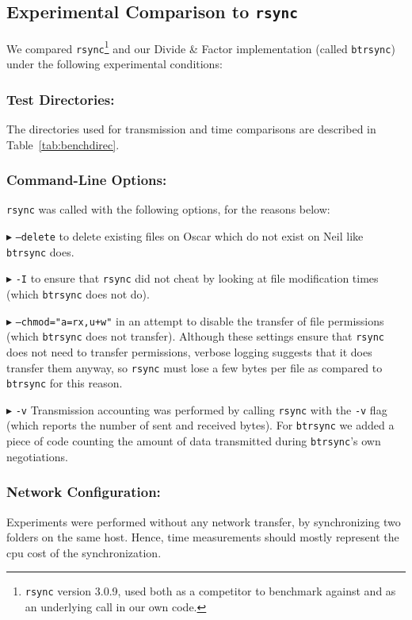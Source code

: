 \documentclass[11pt]{llncs}
\newcommand{\btrsync}{\texttt{btrsync}\xspace}
\newcommand{\rsync}{\texttt{rsync}\xspace}
\begin{document}
\subsection{Experimental Comparison to \rsync}

We compared \rsync\footnote{\rsync version 3.0.9, used both as a competitor to benchmark against and as an underlying call in our own code.}
and our Divide \& Factor implementation (called \btrsync) under the following experimental conditions:

\subsubsection{Test Directories:} The directories used for transmission and time
comparisons are described in Table~\ref{tab:benchdirec}.\smallskip

\subsubsection{Command-Line Options:} \rsync was called with the following options, for the reasons below:

$\blacktriangleright$ {\tt --delete} to delete existing files on Oscar which do
not exist on Neil like \btrsync does.\smallskip

$\blacktriangleright$ {\tt -I} to ensure that \rsync did not cheat by looking at file modification times (which \btrsync does not do).\smallskip

$\blacktriangleright$ {\tt --chmod="a=rx,u+w"} in an attempt to disable the transfer of file permissions (which \btrsync does not transfer). Although these settings ensure that \rsync does not need to transfer permissions, verbose logging suggests that it does transfer them anyway, so \rsync must lose a few bytes per file as compared to \btrsync for this reason.\smallskip

$\blacktriangleright$ {\tt -v} Transmission accounting was performed by calling \rsync with the {\tt -v} flag (which reports the number of sent and received bytes). For \btrsync we added a piece of code counting the amount of data transmitted during \btrsync's own negotiations.\smallskip

\subsubsection{Network Configuration:} Experiments were performed without any network transfer, by synchronizing two folders on the same host. Hence, time measurements should mostly represent the {\sc cpu} cost of the synchronization.
\end{document}
